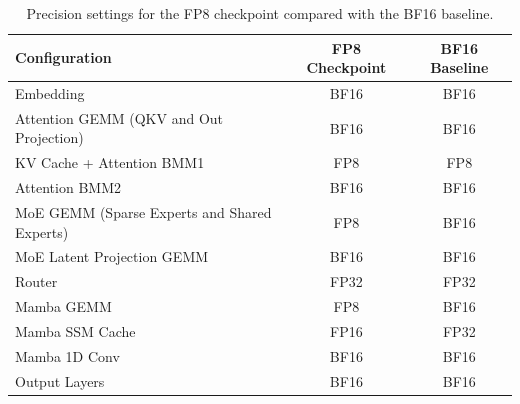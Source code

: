 \begin{table}[h]
\centering
\caption{Precision settings for the FP8 checkpoint compared with the BF16 baseline.}
\label{tab:precision}
\begin{tabular}{l c c}
\toprule
\textbf{Configuration} & \textbf{FP8 Checkpoint} & \textbf{BF16 Baseline} \\
\midrule
Embedding & BF16 & BF16 \\
\midrule
Attention GEMM (QKV and Out Projection) & BF16 & BF16 \\
KV Cache + Attention BMM1 & FP8 & FP8 \\
Attention BMM2 & BF16 & BF16 \\
\midrule
MoE GEMM (Sparse Experts and Shared Experts) & FP8 & BF16 \\
MoE Latent Projection GEMM & BF16 & BF16 \\
Router & FP32 & FP32 \\
\midrule
Mamba GEMM & FP8 & BF16 \\
Mamba SSM Cache & FP16 & FP32 \\
Mamba 1D Conv & BF16 & BF16 \\
\midrule
Output Layers & BF16 & BF16 \\
\bottomrule
\end{tabular}

\vspace{2pt}
\begin{minipage}{\linewidth}
\footnotesize
\end{minipage}
\end{table}



